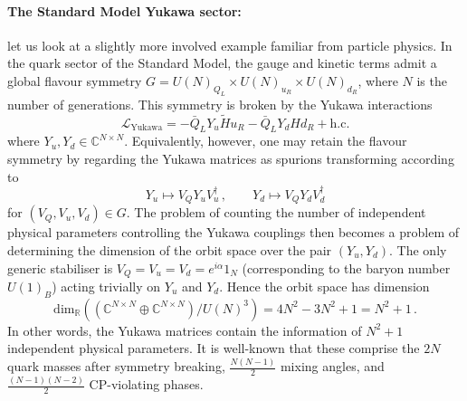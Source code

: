 \documentclass[12pt]{article}
\numberwithin{equation}{section}
\newcommand{\C}{\mathbb{C}}
\renewcommand{\dim}{\mathrm{dim}}
\begin{document}
\paragraph{The Standard Model Yukawa sector:} let us look at a slightly more involved example familiar from particle physics. In the quark sector of the Standard Model, the gauge and kinetic terms admit a global flavour symmetry $G=U(N)_{Q_L}\times U(N)_{u_R}\times U(N)_{d_R}$, where $N$ is the number of generations. This symmetry is broken by the Yukawa interactions
\begin{equation}
    \mathcal{L}_\text{Yukawa} = - \bar{Q}_LY_u\widetilde{H}u_R - \bar{Q}_LY_dHd_R + \text{h.c.}
\end{equation}
where $Y_u,Y_d\in \C^{N\times N}$. Equivalently, however, one may retain the flavour symmetry by regarding the Yukawa matrices as spurions transforming according to
\begin{equation}
    Y_u\mapsto V_QY_uV_u^\dagger\,,\qquad Y_d\mapsto V_QY_dV_d^\dagger
\end{equation}
for $(V_Q,V_u,V_d)\in G$. The problem of counting the number of independent physical parameters controlling the Yukawa couplings then becomes a problem of determining the dimension of the orbit space over the pair $(Y_u,Y_d)$. The only generic stabiliser is $V_Q=V_u=V_d=e^{i\alpha}1_N$  (corresponding to the baryon number $U(1)_B$) acting trivially on $Y_u$ and $Y_d$. Hence the orbit space has dimension 
\begin{equation}
    \dim_\mathbb{R}((\C^{N\times N}\oplus \C^{N\times N})\slash U(N)^3)=4N^2-3N^2+1=N^2+1\,.
\end{equation}
In other words, the Yukawa matrices contain the information of $N^2+1$ independent physical parameters. It is well-known that these comprise the $2N$ quark masses after symmetry breaking, $\tfrac{N(N-1)}{2}$ mixing angles, and $\tfrac{(N-1)(N-2)}{2}$ CP-violating phases. 
\end{document}
